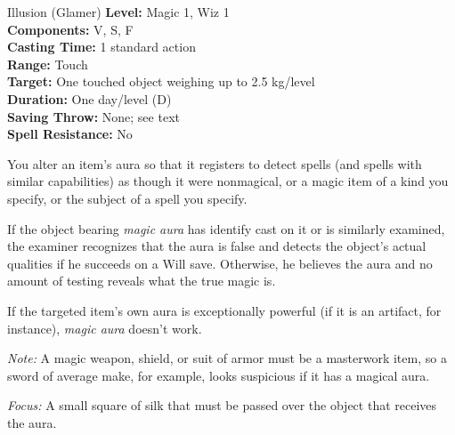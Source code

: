 {Illusion (Glamer)}
{
	\textbf{Level:}
	Magic 1, Wiz 1\\
	\textbf{Components:}
	V, S, F\\
	\textbf{Casting Time:}
	1 standard action\\
	\textbf{Range:}
	Touch\\
	\textbf{Target:}
	One touched object weighing up to 2.5 kg/level\\
	\textbf{Duration:}
	One day/level (D)\\
	\textbf{Saving Throw:}
	None; see text\\
	\textbf{Spell Resistance:}
	No\\
}
{
	You alter an item's aura so that it registers to detect spells (and spells with similar capabilities) as though it were nonmagical, or a magic item of a kind you specify, or the subject of a spell you specify.

	If the object bearing \emph{magic aura} has identify cast on it or is similarly examined, the examiner recognizes that the aura is false and detects the object's actual qualities if he succeeds on a Will save. Otherwise, he believes the aura and no amount of testing reveals what the true magic is.

	If the targeted item's own aura is exceptionally powerful (if it is an artifact, for instance), \emph{magic aura} doesn't work.

	\textit{Note:} A magic weapon, shield, or suit of armor must be a masterwork item, so a sword of average make, for example, looks suspicious if it has a magical aura.

	\textit{Focus:}
	A small square of silk that must be passed over the object that receives the aura.

}
